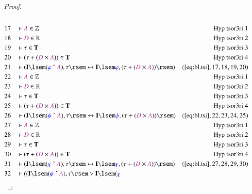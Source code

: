 \begin{proof}
\begin{align}
  \\ 17 &&  & \vdash \mc{A} \in
      \mathbb{Z}&\text{Hyp~tsor3ri.1}\notag%
  \\ 18 &&  & \vdash \mc{D} \in
      \mathbb{R}&\text{Hyp~tsor3ri.2}\notag%
  \\ 19 &&  & \vdash \tau \in
      \mathbf{T}&\text{Hyp~tsor3ri.3}\notag%
  \\ 20 &&  & \vdash ( \tau + ( \mc{D} \times \mc{A} ) ) \in
      \mathbf{T}&\text{Hyp~tsor3ri.4}\notag%
  \\ 21 &&  & \vdash ( \mathbf{I} \lsem ( \mw{\varphi} ~\string^~ \mc{A} ) ,
      \tau \rsem \leftrightarrow \mathbf{I} \lsem
      \mw{\varphi} , ( \tau + ( \mc{D} \times \mc{A} ) )
      \rsem )&(\mbox{\ref{eq:bl.tsi}},17,18,19,20)\notag
  \\ 22 &&  & \vdash \mc{A} \in
      \mathbb{Z}&\text{Hyp~tsor3ri.1}\notag%
  \\ 23 &&  & \vdash \mc{D} \in
      \mathbb{R}&\text{Hyp~tsor3ri.2}\notag%
  \\ 24 &&  & \vdash \tau \in
      \mathbf{T}&\text{Hyp~tsor3ri.3}\notag%
  \\ 25 &&  & \vdash ( \tau + ( \mc{D} \times \mc{A} ) ) \in
      \mathbf{T}&\text{Hyp~tsor3ri.4}\notag%
  \\ 26 &&  & \vdash ( \mathbf{I} \lsem ( \mw{\psi} ~\string^~ \mc{A} ) , \tau
      \rsem \leftrightarrow \mathbf{I} \lsem \mw{\psi} , (
      \tau + ( \mc{D} \times \mc{A} ) ) \rsem
      )&(\mbox{\ref{eq:bl.tsi}},22,23,24,25)\notag
  \\ 27 &&  & \vdash \mc{A} \in
      \mathbb{Z}&\text{Hyp~tsor3ri.1}\notag%
  \\ 28 &&  & \vdash \mc{D} \in
      \mathbb{R}&\text{Hyp~tsor3ri.2}\notag%
  \\ 29 &&  & \vdash \tau \in
      \mathbf{T}&\text{Hyp~tsor3ri.3}\notag%
  \\ 30 &&  & \vdash ( \tau + ( \mc{D} \times \mc{A} ) ) \in
      \mathbf{T}&\text{Hyp~tsor3ri.4}\notag%
  \\ 31 &&  & \vdash ( \mathbf{I} \lsem ( \mw{\chi} ~\string^~ \mc{A} ) , \tau
      \rsem \leftrightarrow \mathbf{I} \lsem \mw{\chi} , (
      \tau + ( \mc{D} \times \mc{A} ) ) \rsem
      )&(\mbox{\ref{eq:bl.tsi}},27,28,29,30)\notag
  \\ 32 &&  & \vdash ( ( \mathbf{I} \lsem ( \mw{\psi} ~\string^~ \mc{A} ) ,
      \tau \rsem \vee \mathbf{I} \lsem ( \mw{\chi}

\end{align}
\end{proof}
